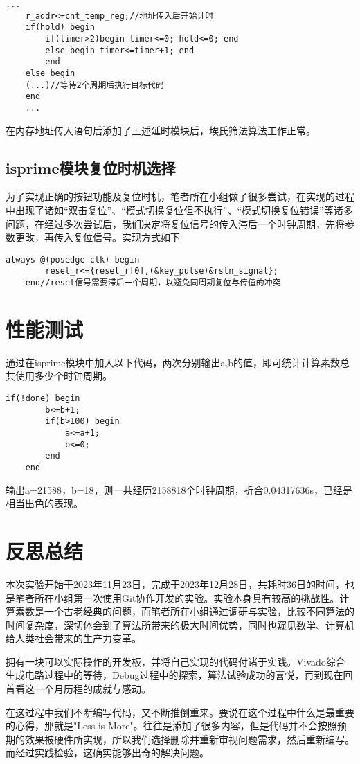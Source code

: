 	\begin{lstlisting}[style=verilog]
	...
	r_addr<=cnt_temp_reg;//地址传入后开始计时
	if(hold) begin
		if(timer>2)begin timer<=0; hold<=0; end
		else begin timer<=timer+1; end
		end
	else begin
	(...)//等待2个周期后执行目标代码
	end
	...
	\end{lstlisting}
	在内存地址传入语句后添加了上述延时模块后，埃氏筛法算法工作正常。
	\subsection{isprime模块复位时机选择}
	为了实现正确的按钮功能及复位时机，笔者所在小组做了很多尝试，在实现的过程中出现了诸如“双击复位”、“模式切换复位但不执行”、“模式切换复位错误”等诸多问题，在经过多次尝试后，我们决定将复位信号的传入滞后一个时钟周期，先将参数更改，再传入复位信号。实现方式如下
	
	\begin{lstlisting}[style=verilog]
	always @(posedge clk) begin
		reset_r<={reset_r[0],(&key_pulse)&rstn_signal};
	end//reset信号需要滞后一个周期，以避免同周期复位与传值的冲突
	\end{lstlisting}
	\section{性能测试}
	通过在isprime模块中加入以下代码，两次分别输出a,b的值，即可统计计算素数总共使用多少个时钟周期。
	\begin{lstlisting}[style=verilog]
	if(!done) begin
		b<=b+1;
		if(b>100) begin
			a<=a+1;
			b<=0;
		end
	end
	\end{lstlisting}
	
	输出a=21588，b=18，则一共经历2158818个时钟周期，折合0.04317636s，已经是相当出色的表现。
	\newpage
	\section{反思总结}
	本次实验开始于2023年11月23日，完成于2023年12月28日，共耗时36日的时间，也是笔者所在小组第一次使用Git协作开发的实验。实验本身具有较高的挑战性。计算素数是一个古老经典的问题，而笔者所在小组通过调研与实验，比较不同算法的时间复杂度，深切体会到了算法所带来的极大时间优势，同时也窥见数学、计算机给人类社会带来的生产力变革。
	
	拥有一块可以实际操作的开发板，并将自己实现的代码付诸于实践。Vivado综合生成电路过程中的等待，Debug过程中的探索，算法试验成功的喜悦，再到现在回首看这一个月历程的成就与感动。
	
	在这过程中我们不断编写代码，又不断推倒重来。要说在这个过程中什么是最重要的心得，那就是"Less is More"。往往是添加了很多内容，但是代码并不会按照预期的效果被硬件所实现，所以我们选择删除并重新审视问题需求，然后重新编写。而经过实践检验，这确实能够出奇的解决问题。
	
